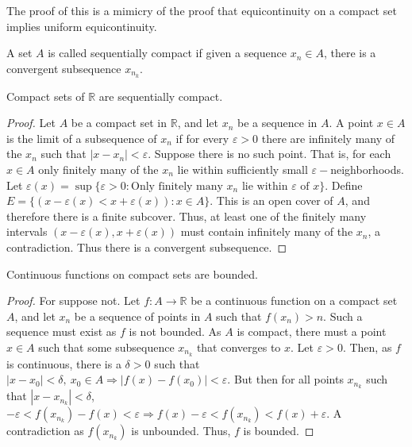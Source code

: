 \documentclass[crop=false,class=book,oneside]{standalone}
\begin{document}
            \begin{remark}
                The proof of this is a mimicry of the proof that equicontinuity on a compact set implies uniform equicontinuity.
            \end{remark}
            \begin{definition}
                A set $A$ is called sequentially compact if given a sequence $x_n\in A$, there is a convergent subsequence $x_{n_k}$.
            \end{definition}
            \begin{theorem}
                Compact sets of $\mathbb{R}$ are sequentially compact.
            \end{theorem}
            \begin{proof}
                Let $A$ be a compact set in $\mathbb{R}$, and let $x_n$ be a sequence in $A$. A point $x\in A$ is the limit of a subsequence of $x_n$ if for every $\varepsilon>0$ there are infinitely many of the $x_n$ such that $|x-x_n|<\varepsilon$. Suppose there is no such point. That is, for each $x\in A$ only finitely many of the $x_n$ lie within sufficiently small $\varepsilon-$neighborhoods. Let $\varepsilon(x) = \sup\{\varepsilon>0:\textrm{Only finitely many }x_n \textrm{ lie within } \varepsilon \textrm{ of } x\}$. Define $E=\{(x-\varepsilon(x)<x+\varepsilon(x)):x\in A\}$. This is an open cover of $A$, and therefore there is a finite subcover. Thus, at least one of the finitely many intervals $(x-\varepsilon(x),x+\varepsilon(x))$ must contain infinitely many of the $x_n$, a contradiction. Thus there is a convergent subsequence.
            \end{proof}
            \begin{theorem}
                Continuous functions on compact sets are bounded.
            \end{theorem}
            \begin{proof}
                For suppose not. Let $f:A\rightarrow \mathbb{R}$ be a continuous function on a compact set $A$, and let $x_n$ be a sequence of points in $A$ such that $f(x_n)>n$. Such a sequence must exist as $f$ is not bounded. As $A$ is compact, there must a point $x\in A$ such that some subsequence $x_{n_k}$ that converges to $x$. Let $\varepsilon >0$. Then, as $f$ is continuous, there is a $\delta>0$ such that $|x-x_0|<\delta,\ x_0\in A\Rightarrow |f(x)-f(x_0)|<\varepsilon$. But then for all points $x_{n_k}$ such that $|x-x_{n_k}|<\delta$, $-\varepsilon<f(x_{n_k})-f(x)<\varepsilon \Rightarrow f(x)-\varepsilon < f(x_{n_k})<f(x)+\varepsilon$. A contradiction as $f(x_{n_k})$ is unbounded. Thus, $f$ is bounded.
            \end{proof}
\end{document}
